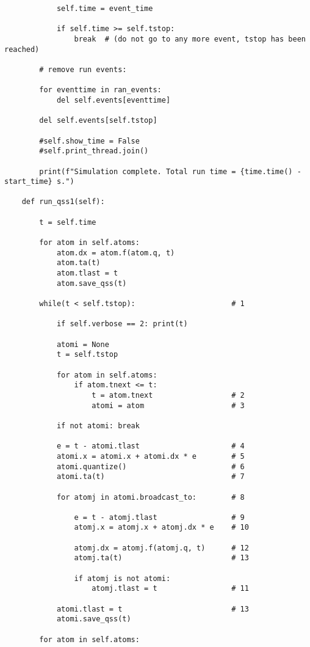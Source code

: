 \begin{lstlisting}
            self.time = event_time

            if self.time >= self.tstop:
                break  # (do not go to any more event, tstop has been reached)

        # remove run events:

        for eventtime in ran_events:
            del self.events[eventtime]

        del self.events[self.tstop]

        #self.show_time = False
        #self.print_thread.join()

        print(f"Simulation complete. Total run time = {time.time() - start_time} s.")

    def run_qss1(self):

        t = self.time

        for atom in self.atoms:
            atom.dx = atom.f(atom.q, t)
            atom.ta(t)
            atom.tlast = t
            atom.save_qss(t)

        while(t < self.tstop):                      # 1

            if self.verbose == 2: print(t)

            atomi = None
            t = self.tstop

            for atom in self.atoms:
                if atom.tnext <= t:
                    t = atom.tnext                  # 2
                    atomi = atom                    # 3

            if not atomi: break

            e = t - atomi.tlast                     # 4
            atomi.x = atomi.x + atomi.dx * e        # 5
            atomi.quantize()                        # 6
            atomi.ta(t)                             # 7

            for atomj in atomi.broadcast_to:        # 8

                e = t - atomj.tlast                 # 9
                atomj.x = atomj.x + atomj.dx * e    # 10

                atomj.dx = atomj.f(atomj.q, t)      # 12
                atomj.ta(t)                         # 13

                if atomj is not atomi:
                    atomj.tlast = t                 # 11

            atomi.tlast = t                         # 13
            atomi.save_qss(t)

        for atom in self.atoms:


\end{lstlisting}
